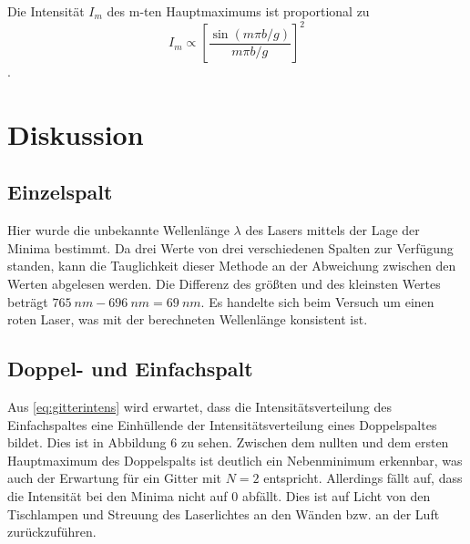 Die Intensität $I_m$ des m-ten Hauptmaximums ist proportional zu 
\begin{equation}
I_m\propto \left[\frac{\sin(m\pi b/g)}{m\pi b/g}\right]^2
\label{eq:formfaktor}
\end{equation}. 
\section{Diskussion}
\subsection{Einzelspalt}
Hier wurde die unbekannte Wellenlänge $\lambda$ des Lasers mittels der Lage der Minima bestimmt. Da drei Werte von drei verschiedenen Spalten zur Verfügung standen, kann die Tauglichkeit dieser Methode an der Abweichung zwischen den Werten abgelesen werden. Die Differenz des größten und des kleinsten Wertes beträgt $\SI{765}{nm}-\SI{696}{nm}=\SI{69}{nm}$. Es handelte sich beim Versuch um einen roten Laser, was mit der berechneten Wellenlänge konsistent ist.
\subsection{Doppel- und Einfachspalt}
Aus \cref{eq:gitterintens} wird erwartet, dass die Intensitätsverteilung des Einfachspaltes eine Einhüllende der Intensitätsverteilung eines Doppelspaltes bildet. Dies ist in Abbildung 6 zu sehen. Zwischen dem nullten und dem ersten Hauptmaximum des Doppelspalts ist deutlich ein Nebenminimum erkennbar, was auch der Erwartung für ein Gitter mit $N=2$ entspricht. Allerdings fällt auf, dass die Intensität bei den Minima nicht auf 0 abfällt. Dies ist auf Licht von den Tischlampen und Streuung des Laserlichtes an den Wänden bzw. an der Luft zurückzuführen.
